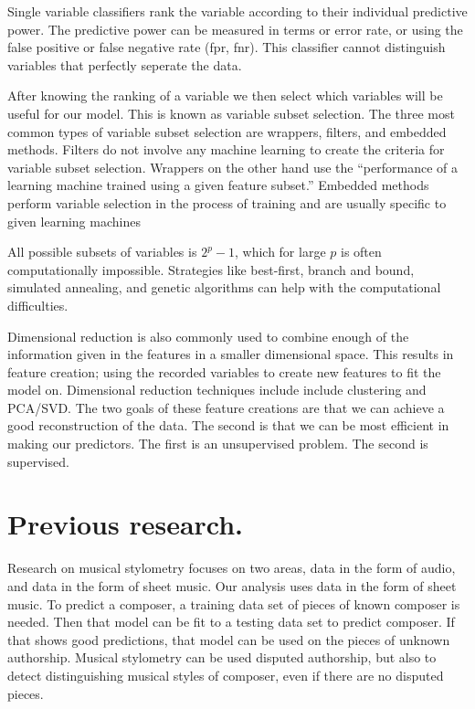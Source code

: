 \documentclass[12pt,twoside]{reedthesis}
\theoremstyle{definition}
\theoremstyle{definition}
\theoremstyle{definition}
\theoremstyle{remark}
\begin{document}
Single variable classifiers rank the variable according to their
individual predictive power. The predictive power can be measured in
terms or error rate, or using the false positive or false negative rate
(fpr, fnr). This classifier cannot distinguish variables that perfectly
seperate the data.

After knowing the ranking of a variable we then select which variables
will be useful for our model. This is known as variable subset
selection. The three most common types of variable subset selection are
wrappers, filters, and embedded methods. Filters do not involve any
machine learning to create the criteria for variable subset selection.
Wrappers on the other hand use the ``performance of a learning machine
trained using a given feature subset.'' Embedded methods perform
variable selection in the process of training and are usually specific
to given learning machines

All possible subsets of variables is \(2^p-1\), which for large \(p\) is
often computationally impossible. Strategies like best-first, branch and
bound, simulated annealing, and genetic algorithms can help with the
computational difficulties.

Dimensional reduction is also commonly used to combine enough of the
information given in the features in a smaller dimensional space. This
results in feature creation; using the recorded variables to create new
features to fit the model on. Dimensional reduction techniques include
include clustering and PCA/SVD. The two goals of these feature creations
are that we can achieve a good reconstruction of the data. The second is
that we can be most efficient in making our predictors. The first is an
unsupervised problem. The second is supervised.

\section{Previous research.}\label{previous-research.}

Research on musical stylometry focuses on two areas, data in the form of
audio, and data in the form of sheet music. Our analysis uses data in
the form of sheet music. To predict a composer, a training data set of
pieces of known composer is needed. Then that model can be fit to a
testing data set to predict composer. If that shows good predictions,
that model can be used on the pieces of unknown authorship. Musical
stylometry can be used disputed authorship, but also to detect
distinguishing musical styles of composer, even if there are no disputed
pieces.
\end{document}
